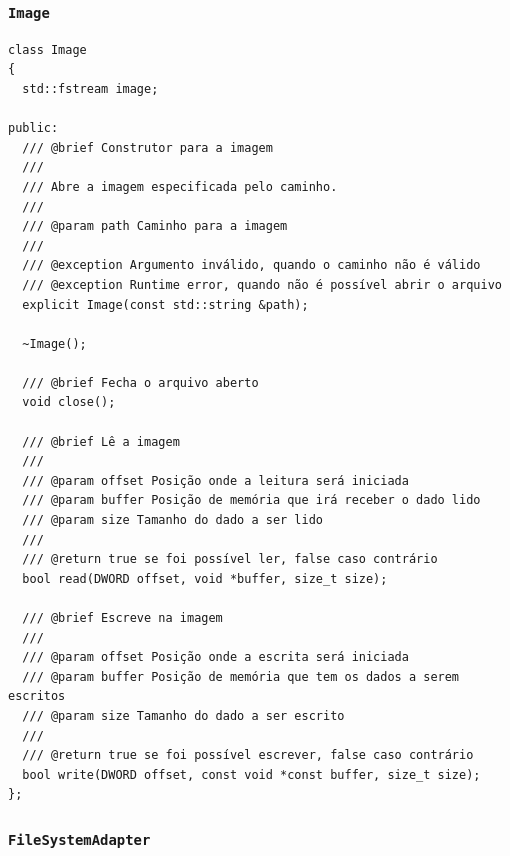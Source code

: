 \documentclass[
    12pt,				%
    oneside,   	        %
    a4paper,			%
    english,			%
    french,				%
    spanish,			%
    brazil,				%
    ]{pacotes/abntex2}
\begin{document}
\subsubsection{\texttt{Image}}
\label{subsubsec:image}

\begin{lstlisting}[caption={Classe para interação do arquivo \texttt{.img} que contém o FAT32 gravado}, label={lst:image}]
class Image
{
  std::fstream image;

public:
  /// @brief Construtor para a imagem
  ///
  /// Abre a imagem especificada pelo caminho.
  ///
  /// @param path Caminho para a imagem
  ///
  /// @exception Argumento inválido, quando o caminho não é válido
  /// @exception Runtime error, quando não é possível abrir o arquivo
  explicit Image(const std::string &path);

  ~Image();

  /// @brief Fecha o arquivo aberto
  void close();

  /// @brief Lê a imagem
  ///
  /// @param offset Posição onde a leitura será iniciada
  /// @param buffer Posição de memória que irá receber o dado lido
  /// @param size Tamanho do dado a ser lido
  ///
  /// @return true se foi possível ler, false caso contrário
  bool read(DWORD offset, void *buffer, size_t size);

  /// @brief Escreve na imagem
  ///
  /// @param offset Posição onde a escrita será iniciada
  /// @param buffer Posição de memória que tem os dados a serem escritos
  /// @param size Tamanho do dado a ser escrito
  ///
  /// @return true se foi possível escrever, false caso contrário
  bool write(DWORD offset, const void *const buffer, size_t size);
};
\end{lstlisting}

\subsubsection{\texttt{FileSystemAdapter}}
\label{subsubsec:file_system_adapter}
\end{document}
